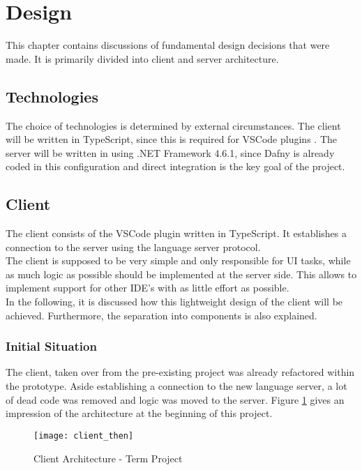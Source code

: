 \section{Design}
This chapter contains discussions of fundamental design decisions that were made.
It is primarily divided into client and server architecture.

\subsection{Technologies}
The choice of technologies is determined by external circumstances.
The client will be written in TypeScript, since this is required for VSCode plugins \cite{vscodeAPI}.
The server will be written in \CsharpWithSpace using .NET Framework 4.6.1, since Dafny is already coded in this configuration and direct integration is the key goal of the project.


\subsection{Client}
The client consists of the VSCode plugin written in TypeScript.
It establishes a connection to the server using the language server protocol.\\

The client is supposed to be very simple and only responsible for UI tasks, while as much logic as possible should be implemented at the server side.
This allows to implement support for other IDE's with as little effort as possible.\\

In the following, it is discussed how this lightweight design of the client will be achieved.
Furthermore, the separation into components is also explained.

\subsubsection{Initial Situation}
The client, taken over from the pre-existing project was already refactored within the prototype.
Aside establishing a connection to the new language server, a lot of dead code was removed and logic was moved to the server.
Figure \ref{fig:client_then} gives an impression of the architecture at the beginning of this project.

\begin{figure}[H]
    \centering
    \texttt{[image: client\_then]}
    \caption{Client Architecture - Term Project}
    \label{fig:client_then}
\end{figure}

